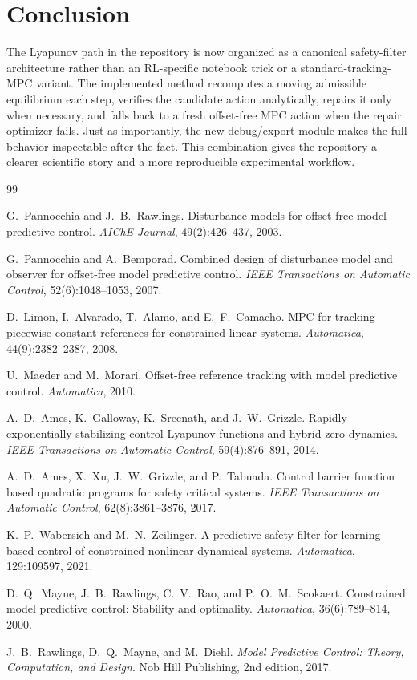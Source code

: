 \documentclass[11pt]{article}
\begin{document}
\section{Conclusion}
The Lyapunov path in the repository is now organized as a canonical safety-filter architecture rather than an RL-specific notebook trick or a standard-tracking-MPC variant. The implemented method recomputes a moving admissible equilibrium each step, verifies the candidate action analytically, repairs it only when necessary, and falls back to a fresh offset-free MPC action when the repair optimizer fails. Just as importantly, the new debug/export module makes the full behavior inspectable after the fact. This combination gives the repository a clearer scientific story and a more reproducible experimental workflow.

\begin{thebibliography}{99}

G.~Pannocchia and J.~B.~Rawlings.
\newblock Disturbance models for offset-free model-predictive control.
\newblock \emph{AIChE Journal}, 49(2):426--437, 2003.

G.~Pannocchia and A.~Bemporad.
\newblock Combined design of disturbance model and observer for offset-free model predictive control.
\newblock \emph{IEEE Transactions on Automatic Control}, 52(6):1048--1053, 2007.

D.~Limon, I.~Alvarado, T.~Alamo, and E.~F.~Camacho.
\newblock MPC for tracking piecewise constant references for constrained linear systems.
\newblock \emph{Automatica}, 44(9):2382--2387, 2008.

U.~Maeder and M.~Morari.
\newblock Offset-free reference tracking with model predictive control.
\newblock \emph{Automatica}, 2010.

A.~D.~Ames, K.~Galloway, K.~Sreenath, and J.~W.~Grizzle.
\newblock Rapidly exponentially stabilizing control Lyapunov functions and hybrid zero dynamics.
\newblock \emph{IEEE Transactions on Automatic Control}, 59(4):876--891, 2014.

A.~D.~Ames, X.~Xu, J.~W.~Grizzle, and P.~Tabuada.
\newblock Control barrier function based quadratic programs for safety critical systems.
\newblock \emph{IEEE Transactions on Automatic Control}, 62(8):3861--3876, 2017.

K.~P.~Wabersich and M.~N.~Zeilinger.
\newblock A predictive safety filter for learning-based control of constrained nonlinear dynamical systems.
\newblock \emph{Automatica}, 129:109597, 2021.

D.~Q.~Mayne, J.~B.~Rawlings, C.~V.~Rao, and P.~O.~M.~Scokaert.
\newblock Constrained model predictive control: Stability and optimality.
\newblock \emph{Automatica}, 36(6):789--814, 2000.

J.~B.~Rawlings, D.~Q.~Mayne, and M.~Diehl.
\newblock \emph{Model Predictive Control: Theory, Computation, and Design}.
\newblock Nob Hill Publishing, 2nd edition, 2017.

\end{thebibliography}
\end{document}

